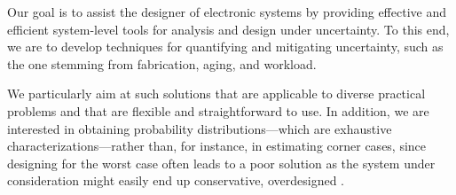 Our goal is to assist the designer of electronic systems by providing effective
and efficient system-level tools for analysis and design under uncertainty. To
this end, we are to develop techniques for quantifying and mitigating
uncertainty, such as the one stemming from fabrication, aging, and workload.

We particularly aim at such solutions that are applicable to diverse practical
problems and that are flexible and straightforward to use. In addition, we are
interested in obtaining probability distributions---which are exhaustive
characterizations---rather than, for instance, in estimating corner cases, since
designing for the worst case often leads to a poor solution as the system under
consideration might easily end up conservative, overdesigned \cite{quinton2012}.
